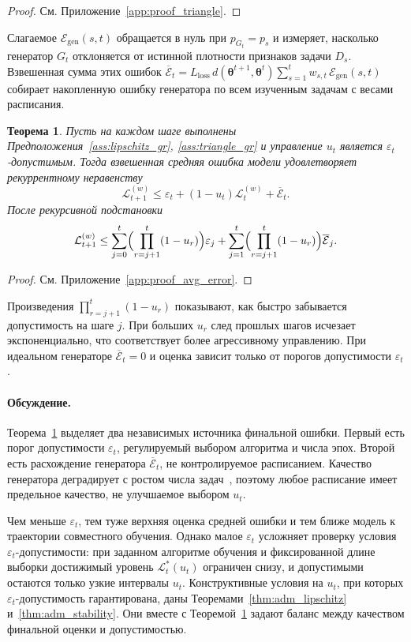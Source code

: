 \documentclass[a4paper,14pt,oneside,openany]{extarticle}
\newtheorem{theorem}{Теорема}
\newcommand{\cL}{\mathcal{L}}
\newcommand{\cE}{\mathcal{E}}
\newcommand{\btheta}{\boldsymbol{\theta}}
\begin{document}
\begin{proof}См. Приложение~\ref{app:proof_triangle}.\end{proof}

Слагаемое $\cE_{\mathrm{gen}}(s, t)$ обращается в нуль при $p_{G_t} = p_s$ и измеряет, насколько генератор $G_t$ отклоняется от истинной плотности признаков задачи $D_s$. Взвешенная сумма этих ошибок $\overline{\mathcal E}_t = L_{\text{loss}}\, d(\btheta^{t+1}, \btheta^t) \sum_{s=1}^t w_{s, t}\, \cE_{\mathrm{gen}}(s, t)$ собирает накопленную ошибку генератора по всем изученным задачам с весами расписания.

\begin{theorem}\label{thm:avg_error_gr}
    Пусть на каждом шаге выполнены Предположения~\ref{ass:lipschitz_gr}, \ref{ass:triangle_gr} и управление $u_t$ является $\varepsilon_t$-допустимым. Тогда взвешенная средняя ошибка модели удовлетворяет рекуррентному неравенству
    \[
        \cL^{(w)}_{t+1} \le \varepsilon_t + (1 - u_t) \cL^{(w)}_t + \overline{\mathcal E}_t.
    \]
    После рекурсивной подстановки
    \[
        \cL^{(w)}_{t+1} \le \sum_{j=0}^{t}\Bigl(\prod_{r=j+1}^{t}(1 - u_r)\Bigr)\varepsilon_j + \sum_{j=1}^{t}\Bigl(\prod_{r=j+1}^{t}(1 - u_r)\Bigr) \overline{\mathcal E}_j.
    \]
\end{theorem}

\begin{proof}См. Приложение~\ref{app:proof_avg_error}.\end{proof}

Произведения $\prod_{r=j+1}^{t}(1 - u_r)$ показывают, как быстро забывается допустимость на шаге $j$. При больших $u_r$ след прошлых шагов исчезает экспоненциально, что соответствует более агрессивному управлению. При идеальном генераторе $\overline{\mathcal E}_t = 0$ и оценка зависит только от порогов допустимости $\varepsilon_t$.

\paragraph{Обсуждение.}
Теорема~\ref{thm:avg_error_gr} выделяет два независимых источника финальной ошибки. Первый есть порог допустимости $\varepsilon_t$, регулируемый выбором алгоритма и числа эпох. Второй есть расхождение генератора $\overline{\mathcal E}_t$, не контролируемое расписанием. Качество генератора деградирует с ростом числа задач~\cite{shin2017continual}, поэтому любое расписание имеет предельное качество, не улучшаемое выбором $u_t$.

Чем меньше $\varepsilon_t$, тем туже верхняя оценка средней ошибки и тем ближе модель к траектории совместного обучения. Однако малое $\varepsilon_t$ усложняет проверку условия $\varepsilon_t$-допустимости: при заданном алгоритме обучения и фиксированной длине выборки достижимый уровень $\cL^*_t(u_t)$ ограничен снизу, и допустимыми остаются только узкие интервалы $u_t$. Конструктивные условия на $u_t$, при которых $\varepsilon_t$-допустимость гарантирована, даны Теоремами~\ref{thm:adm_lipschitz} и~\ref{thm:adm_stability}. Они вместе с Теоремой~\ref{thm:avg_error_gr} задают баланс между качеством финальной оценки и допустимостью.
\end{document}
